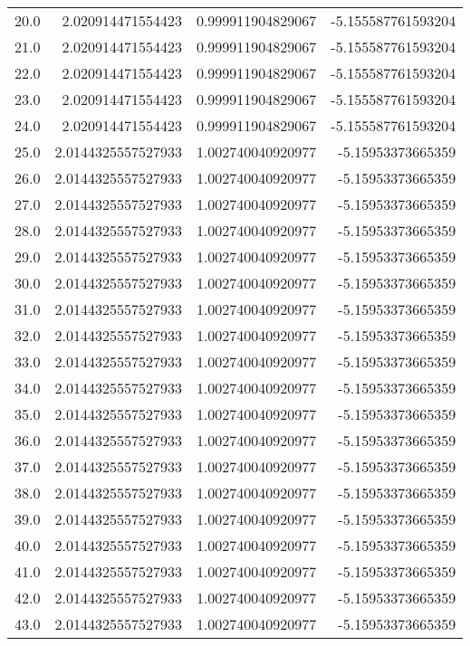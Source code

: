 \begin{longtable}{lrrr}
20.0 & 2.020914471554423 & 0.999911904829067 & -5.155587761593204 \\
21.0 & 2.020914471554423 & 0.999911904829067 & -5.155587761593204 \\
22.0 & 2.020914471554423 & 0.999911904829067 & -5.155587761593204 \\
23.0 & 2.020914471554423 & 0.999911904829067 & -5.155587761593204 \\
24.0 & 2.020914471554423 & 0.999911904829067 & -5.155587761593204 \\
25.0 & 2.0144325557527933 & 1.002740040920977 & -5.15953373665359 \\
26.0 & 2.0144325557527933 & 1.002740040920977 & -5.15953373665359 \\
27.0 & 2.0144325557527933 & 1.002740040920977 & -5.15953373665359 \\
28.0 & 2.0144325557527933 & 1.002740040920977 & -5.15953373665359 \\
29.0 & 2.0144325557527933 & 1.002740040920977 & -5.15953373665359 \\
30.0 & 2.0144325557527933 & 1.002740040920977 & -5.15953373665359 \\
31.0 & 2.0144325557527933 & 1.002740040920977 & -5.15953373665359 \\
32.0 & 2.0144325557527933 & 1.002740040920977 & -5.15953373665359 \\
33.0 & 2.0144325557527933 & 1.002740040920977 & -5.15953373665359 \\
34.0 & 2.0144325557527933 & 1.002740040920977 & -5.15953373665359 \\
35.0 & 2.0144325557527933 & 1.002740040920977 & -5.15953373665359 \\
36.0 & 2.0144325557527933 & 1.002740040920977 & -5.15953373665359 \\
37.0 & 2.0144325557527933 & 1.002740040920977 & -5.15953373665359 \\
38.0 & 2.0144325557527933 & 1.002740040920977 & -5.15953373665359 \\
39.0 & 2.0144325557527933 & 1.002740040920977 & -5.15953373665359 \\
40.0 & 2.0144325557527933 & 1.002740040920977 & -5.15953373665359 \\
41.0 & 2.0144325557527933 & 1.002740040920977 & -5.15953373665359 \\
42.0 & 2.0144325557527933 & 1.002740040920977 & -5.15953373665359 \\
43.0 & 2.0144325557527933 & 1.002740040920977 & -5.15953373665359 \\

\end{longtable}
